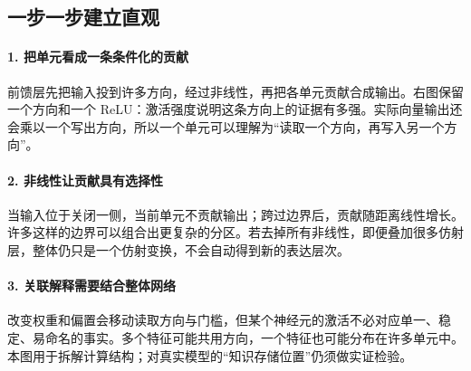 \subsection*{一步一步建立直观}

\paragraph{1. 把单元看成一条条件化的贡献}

前馈层先把输入投到许多方向，经过非线性，再把各单元贡献合成输出。右图保留一个方向和一个 ReLU：激活强度说明这条方向上的证据有多强。实际向量输出还会乘以一个写出方向，所以一个单元可以理解为“读取一个方向，再写入另一个方向”。



\paragraph{2. 非线性让贡献具有选择性}

当输入位于关闭一侧，当前单元不贡献输出；跨过边界后，贡献随距离线性增长。许多这样的边界可以组合出更复杂的分区。若去掉所有非线性，即便叠加很多仿射层，整体仍只是一个仿射变换，不会自动得到新的表达层次。



\paragraph{3. 关联解释需要结合整体网络}

改变权重和偏置会移动读取方向与门槛，但某个神经元的激活不必对应单一、稳定、易命名的事实。多个特征可能共用方向，一个特征也可能分布在许多单元中。本图用于拆解计算结构；对真实模型的“知识存储位置”仍须做实证检验。
